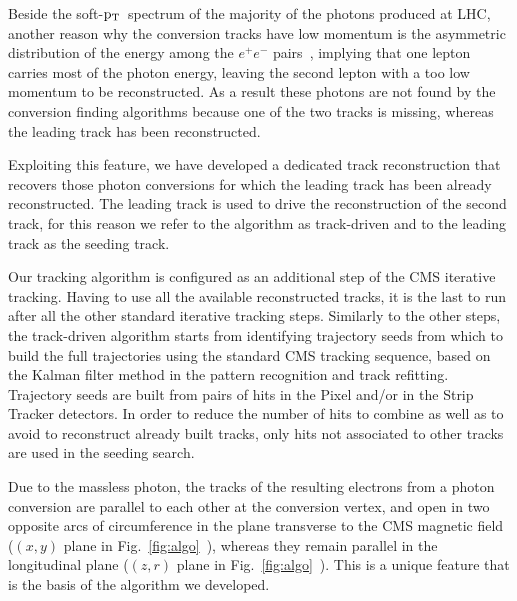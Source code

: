 \documentclass[a4paper]{jpconf}
\def \pt{$\p_{\rm T}$~}
\begin{document}
Beside the soft-\pt spectrum of the majority of the photons produced at LHC, another reason why the conversion tracks have low momentum is the asymmetric distribution of the energy among the $e^+e^-$ pairs~\cite{pdg}, implying that one lepton carries most of the photon energy, leaving the second lepton with a too low momentum to be reconstructed. As a result these photons are not found by the conversion finding algorithms because  one of the two tracks is missing, whereas the leading track has been reconstructed.

Exploiting this feature, we have developed a dedicated track reconstruction that recovers those photon conversions for which the 
leading  track has been already reconstructed. The leading track is used to drive the reconstruction of the second track, for this reason we refer to the algorithm as track-driven and to the leading track as the seeding track.

Our tracking algorithm is configured as an additional step of the CMS iterative tracking. Having to use all the available reconstructed tracks, it is the last to run after all the other standard iterative tracking steps.
%
Similarly to  the other steps, the track-driven algorithm starts from identifying trajectory seeds from which to build the full trajectories using the standard CMS tracking sequence, based on the Kalman filter method in the pattern recognition and track refitting.
Trajectory seeds are built from pairs of hits
in the Pixel and/or in the Strip Tracker detectors. 
In order to reduce the number of hits to combine as well as to avoid to reconstruct already built tracks,  only hits not associated to other tracks are used in the seeding search.

Due to the massless photon, the tracks of the resulting electrons from a photon conversion are parallel to each other at the conversion vertex, and open in two opposite arcs of circumference in the  plane transverse to the CMS magnetic field ($(x,y)$ plane in Fig.~\ref{fig:algo}~),
whereas they  remain parallel in the  longitudinal plane ($(z,r)$ plane in Fig.~\ref{fig:algo}~). This is a unique feature that is the basis of the algorithm we developed. 
\end{document}
